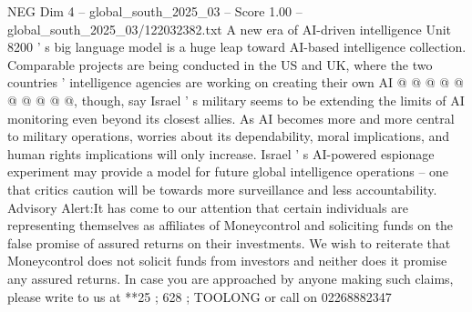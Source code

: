 \begin{textsample}{NEG Dim 4 – global\_south\_2025\_03 – Score 1.00 – global\_south\_2025\_03/122032382.txt}
A new era of AI-driven intelligence Unit 8200 ' s big language model is a huge leap toward AI-based intelligence collection.
Comparable projects are being conducted in the US and UK, where the two countries ' intelligence agencies are working on creating their own AI @ @ @ @ @ @ @ @ @ @, though, say Israel ' s military seems to be extending the limits of AI monitoring even beyond its closest allies.
As AI becomes more and more central to military operations, worries about its dependability, moral implications, and human rights implications will only increase.
Israel ' s AI-powered espionage experiment may provide a model for future global intelligence operations -- one that critics caution will be towards more surveillance and less accountability.
Advisory Alert:It has come to our attention that certain individuals are representing themselves as affiliates of Moneycontrol and soliciting funds on the false promise of assured returns on their investments.
We wish to reiterate that Moneycontrol does not solicit funds from investors and neither does it promise any assured returns.
In case you are approached by anyone making such claims, please write to us at **25 ; 628 ; TOOLONG or call on 02268882347

\end{textsample}
